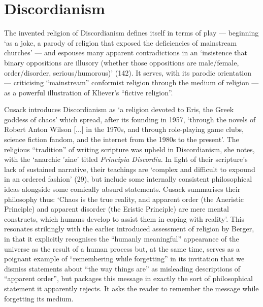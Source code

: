 \documentclass[Draft.tex]{subfiles}
\begin{document}
\section*{Discordianism}
The invented religion of Discordianism defines itself in terms of play
--- beginning `as a joke, a parody of religion that exposed the deficiencies
of mainstream churches' \parencite[126]{Cusack11} ---
and espouses many apparent contradictions in an
`insistence that binary oppositions are illusory
(whether those oppositions are male/female, order/disorder,
serious/humorous)' (142).
It serves, with its parodic orientation --- criticising
``mainstream'' conformist religion through the medium of religion ---
as a powerful illustration of Kliever's ``fictive religion''.

Cusack \parencite*[27]{Cusack10} introduces Discordianism as
`a religion devoted to Eris, the Greek goddess of chaos'
which spread, after its founding in 1957, `through
the novels of Robert Anton Wilson [...] in the 1970s,
and through role-playing game clubs, science fiction fandom,
and the internet from the 1980s to the present'.
The religious ``tradition'' of writing scripture was upheld in Discordianism,
she notes, with the `anarchic 'zine' titled \textit{Principia Discordia}.
In light of their scripture's lack of sustained narrative, their teachings
are `complex and difficult to expound in an ordered fashion' (29),
but include some internally consistent philosophical ideas
alongside some comically absurd statements.
Cusack \parencite*[128]{Cusack11} summarises their philosophy thus:
`Chaos is the true reality, and apparent order (the Aneristic Principle)
and apparent disorder (the Eristic Principle) are mere mental constructs,
which humans develop to assist them in coping with reality'.
This resonates strikingly with the earlier introduced
assessment of religion by Berger, in that it explicitly recognises the
``humanly meaningful'' appearance of the universe as the
result of a human process but, at the same time,
serves as a poignant example of ``remembering while forgetting''
in its invitation that we dismiss statements about ``the way things are''
as misleading descriptions of ``apparent order'', but packages this message
in exactly the sort of philosophical statement it apparently rejects.
It asks the reader to remember the message while forgetting its medium.
\end{document}
